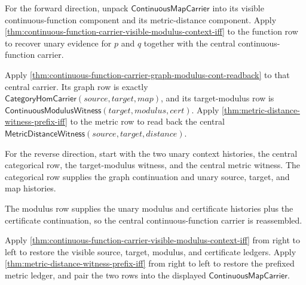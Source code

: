 For the forward direction, unpack $\mathsf{ContinuousMapCarrier}$ into its
visible continuous-function component and its metric-distance component. Apply
\autoref{thm:continuous-function-carrier-visible-modulus-context-iff} to the
function row to recover unary evidence for $p$ and $q$ together with the central
continuous-function carrier.

Apply
\autoref{thm:continuous-function-carrier-graph-modulus-cont-readback} to that
central carrier. Its graph row is exactly
$\mathsf{CategoryHomCarrier}(source,target,map)$, and its target-modulus row is
$\mathsf{ContinuousModulusWitness}(target,modulus,cert)$. Apply
\autoref{thm:metric-distance-witness-prefix-iff} to the metric row to read back
the central $\mathsf{MetricDistanceWitness}(source,target,distance)$.

For the reverse direction, start with the two unary context histories, the
central categorical row, the target-modulus witness, and the central metric
witness. The categorical row supplies the graph continuation and unary source,
target, and map histories.

The modulus row supplies the unary modulus and certificate histories plus the
certificate continuation, so the central continuous-function carrier is
reassembled.

Apply
\autoref{thm:continuous-function-carrier-visible-modulus-context-iff} from
right to left to restore the visible source, target, modulus, and certificate
ledgers. Apply \autoref{thm:metric-distance-witness-prefix-iff} from right to
left to restore the prefixed metric ledger, and pair the two rows into the
displayed $\mathsf{ContinuousMapCarrier}$.
